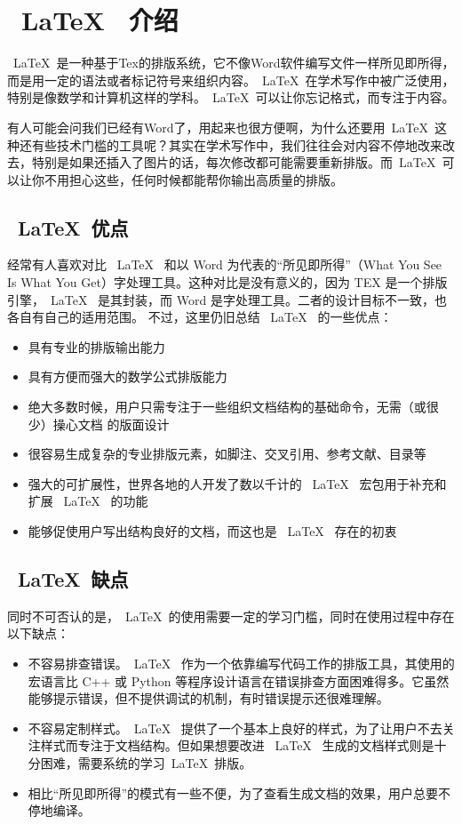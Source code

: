 \chapter{~\LaTeX~ 介绍}

~\LaTeX~是一种基于Tex的排版系统，它不像Word软件编写文件一样所见即所得，而是用一定的语法或者标记符号来组织内容。~\LaTeX~在学术写作中被广泛使用，特别是像数学和计算机这样的学科。~\LaTeX~可以让你忘记格式，而专注于内容。

有人可能会问我们已经有Word了，用起来也很方便啊，为什么还要用~\LaTeX~这种还有些技术门槛的工具呢？其实在学术写作中，我们往往会对内容不停地改来改去，特别是如果还插入了图片的话，每次修改都可能需要重新排版。而~\LaTeX~可以让你不用担心这些，任何时候都能帮你输出高质量的排版。

\section{~\LaTeX~优点}

经常有人喜欢对比 ~\LaTeX~ 和以 Word 为代表的“所见即所得”（What You See Is What You Get）字处理工具。这种对比是没有意义的，因为 TEX 是一个排版引擎，~\LaTeX~ 是其封装，而 Word 是字处理工具。二者的设计目标不一致，也各自有自己的适用范围。 不过，这里仍旧总结 ~\LaTeX~ 的一些优点：


\begin{itemize}
    \item 具有专业的排版输出能力
    \item 具有方便而强大的数学公式排版能力
    \item 绝大多数时候，用户只需专注于一些组织文档结构的基础命令，无需（或很少）操心文档 的版面设计
    \item 很容易生成复杂的专业排版元素，如脚注、交叉引用、参考文献、目录等
    \item 强大的可扩展性，世界各地的人开发了数以千计的 ~\LaTeX~ 宏包用于补充和扩展 ~\LaTeX~ 的功能
    \item 能够促使用户写出结构良好的文档，而这也是 ~\LaTeX~ 存在的初衷
\end{itemize}

\section{~\LaTeX~缺点}

同时不可否认的是，~\LaTeX~的使用需要一定的学习门槛，同时在使用过程中存在以下缺点：

\begin{itemize}
    \item 不容易排查错误。~\LaTeX~ 作为一个依靠编写代码工作的排版工具，其使用的宏语言比 C++ 或 Python 等程序设计语言在错误排查方面困难得多。它虽然能够提示错误，但不提供调试的机制，有时错误提示还很难理解。
    \item 不容易定制样式。~\LaTeX~ 提供了一个基本上良好的样式，为了让用户不去关注样式而专注于文档结构。但如果想要改进 ~\LaTeX~ 生成的文档样式则是十分困难，需要系统的学习~\LaTeX~排版。
    \item 相比“所见即所得”的模式有一些不便，为了查看生成文档的效果，用户总要不停地编译。
\end{itemize}

